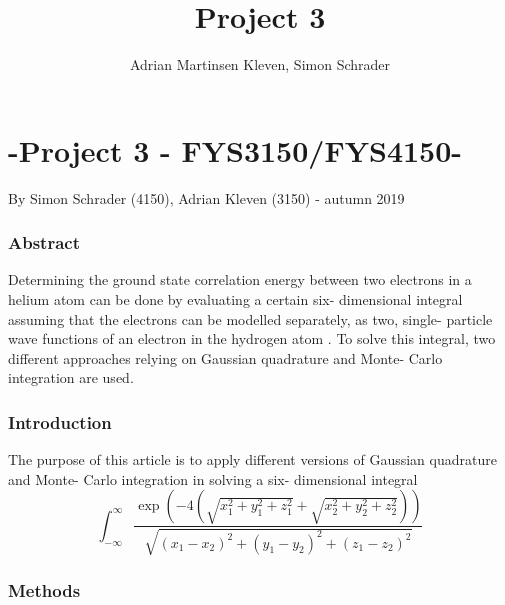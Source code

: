 \documentclass[10pt,a4paper]{article}
\author{Adrian Martinsen Kleven, Simon Schrader}
\title{Project 3}
\begin{document}
\part*{-Project 3 - FYS3150/FYS4150-
}
{\large By Simon Schrader (4150), Adrian Kleven (3150) - autumn 2019
}
\tableofcontents

\listoffigures
\listoftables

 
\clearpage
 
\section{Abstract}
Determining the ground state correlation energy between two electrons in a helium atom can be done by evaluating a certain six- dimensional integral assuming that the electrons can be modelled separately, as two, single- particle wave functions of an electron in the hydrogen atom \cite{Problem_set_3}. To solve this integral, two different approaches relying on Gaussian quadrature and Monte- Carlo integration are used.
\section{Introduction} 
The purpose of this article is to apply different versions of Gaussian quadrature and Monte- Carlo integration in solving a six- dimensional integral
$$
\int_{-\infty}^\infty \frac{\exp \left( -4\left( \sqrt{x_1^2+y_1^2+z_1^2}+\sqrt{x_2^2+y_2^2+z_2^2} \right) \right)}{\sqrt{(x_1-x_2)^2+(y_1-y_2)^2+(z_1-z_2)^2}}
$$
\section{Methods}
\end{document}
